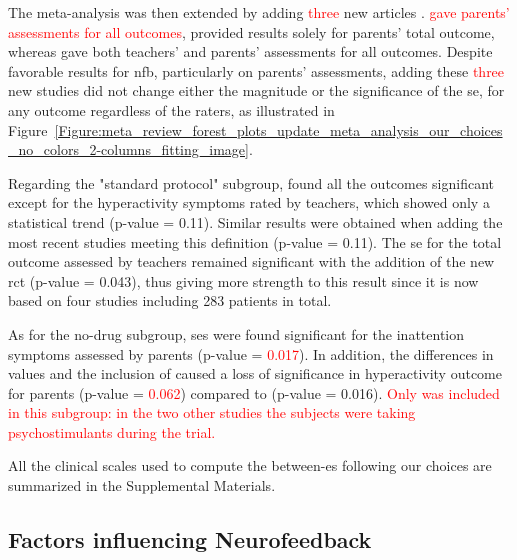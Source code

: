 The meta-analysis was then extended by adding \textcolor{red}{three} new articles \citep{Strehl2017, Baumeister2016, Bazanova2018}. 
\citet{Bazanova2018} \textcolor{red}{gave parents' assessments for all outcomes}, \citet{Baumeister2016} provided results solely for parents' 
total outcome, whereas \citet{Strehl2017} gave both teachers' and parents' assessments for all outcomes. Despite favorable results 
for \gls{nfb}, particularly on parents' assessments, adding these \textcolor{red}{three} new studies did not change either the magnitude or the significance 
of the \gls{se}, for any outcome regardless of the raters, as illustrated in 
Figure~\ref{Figure:meta_review_forest_plots_update_meta_analysis_our_choices_no_colors_2-columns_fitting_image}. 

Regarding the "standard protocol" subgroup, \citet{Cortese2016} found all the outcomes significant except for the 
hyperactivity symptoms rated by teachers, which showed only a statistical trend (p-value = 0.11). Similar results 
were obtained when adding the most recent studies meeting this definition \citep{Strehl2017, Baumeister2016} (p-value = 0.11). 
The \gls{se} for the total outcome assessed by teachers remained significant with the addition of the new
\gls{rct} (p-value = 0.043), thus giving more strength to this result since it is now based on four studies including 283
patients in total.

As for the no-drug subgroup, \glspl{se} were found significant for the inattention symptoms assessed by parents (p-value = \textcolor{red}{0.017}). 
In addition, the differences in \citet{Arnold2014} values and the inclusion of \citet{Bazanova2018} caused a 
loss of significance in hyperactivity outcome for parents (p-value = \textcolor{red}{0.062}) compared to \citet{Cortese2016} 
(p-value = 0.016). \textcolor{red}{Only} \citet{Bazanova2018} \textcolor{red}{was included in this subgroup: in the two other 
studies the subjects were taking psychostimulants during the trial.}

All the clinical scales used to compute the between-\gls{es} following our choices are summarized in the Supplemental Materials.

\subsection{Factors influencing Neurofeedback}

